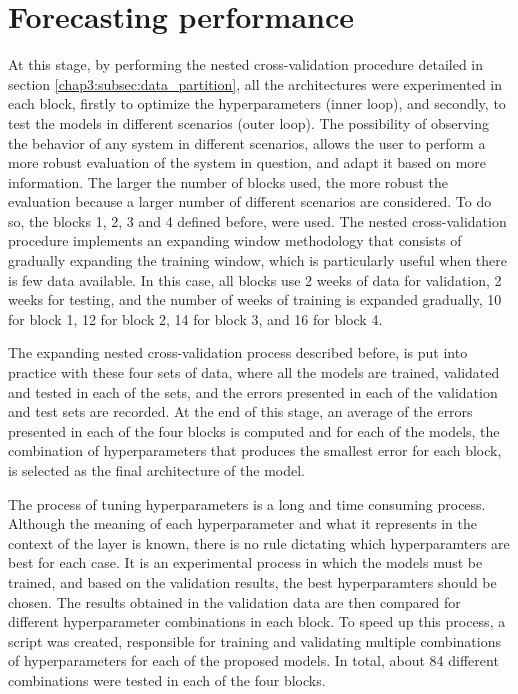 \section{Forecasting performance}\label{chap3:section:stage_1}

At this stage, by performing the nested cross-validation procedure detailed in section \ref{chap3:subsec:data_partition}, all the architectures were experimented in each block, firstly to optimize the hyperparameters (inner loop), and secondly, to test the models in different scenarios (outer loop). The possibility of observing the behavior of any system in different scenarios, allows the user to perform a more robust evaluation of the system in question, and adapt it based on more information. The larger the number of blocks used, the more robust the evaluation because a larger number of different scenarios are considered. To do so, the blocks 1, 2, 3 and 4 defined before, were used. The nested cross-validation procedure implements an expanding window methodology that consists of gradually expanding the training window, which is particularly useful when there is few data available. In this case, all blocks use 2 weeks of data for validation, 2 weeks for testing, and the number of weeks of training is expanded gradually, 10 for block 1, 12 for block 2, 14 for block 3, and 16 for block 4.

The expanding nested cross-validation process described before, is put into practice with these four sets of data, where all the models are trained, validated and tested in each of the sets, and the errors presented in each of the validation and test sets are recorded. At the end of this stage, an average of the errors presented in each of the four blocks is computed and for each of the models, the combination of hyperparameters that produces the smallest error for each block, is selected as the final architecture of the model. 

The process of tuning hyperparameters is a long and time consuming process. Although the meaning of each hyperparameter and what it represents in the context of the layer is known, there is no rule dictating which hyperparamters are best for each case. It is an experimental process in which the models must be trained, and based on the validation results, the best hyperparamters should be chosen. The results obtained in the validation data are then compared for different hyperparameter combinations in each block. To speed up this process, a script \cite{} was created, responsible for training and validating multiple combinations of hyperparameters for each of the proposed models. In total, about 84 different combinations were tested in each of the four blocks.


